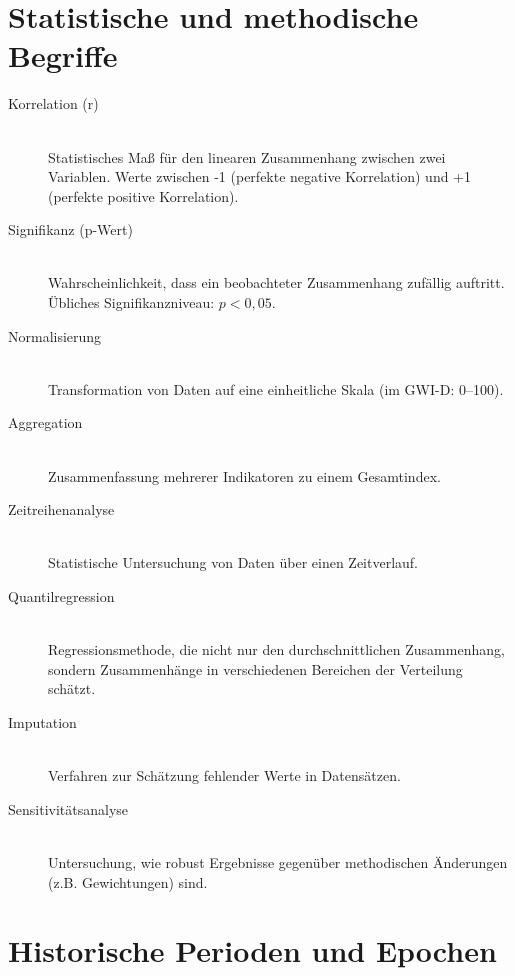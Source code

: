 \section{Statistische und methodische Begriffe}

\begin{description}
    \item[Korrelation (r)] \hfill \\
    Statistisches Maß für den linearen Zusammenhang zwischen zwei Variablen. Werte zwischen -1 (perfekte negative Korrelation) und +1 (perfekte positive Korrelation).
    
    \item[Signifikanz (p-Wert)] \hfill \\
    Wahrscheinlichkeit, dass ein beobachteter Zusammenhang zufällig auftritt. Übliches Signifikanzniveau: \(p < 0,05\).
    
    \item[Normalisierung] \hfill \\
    Transformation von Daten auf eine einheitliche Skala (im GWI-D: 0–100).
    
    \item[Aggregation] \hfill \\
    Zusammenfassung mehrerer Indikatoren zu einem Gesamtindex.
    
    \item[Zeitreihenanalyse] \hfill \\
    Statistische Untersuchung von Daten über einen Zeitverlauf.
    
    \item[Quantilregression] \hfill \\
    Regressionsmethode, die nicht nur den durchschnittlichen Zusammenhang, sondern Zusammenhänge in verschiedenen Bereichen der Verteilung schätzt.
    
    \item[Imputation] \hfill \\
    Verfahren zur Schätzung fehlender Werte in Datensätzen.
    
    \item[Sensitivitätsanalyse] \hfill \\
    Untersuchung, wie robust Ergebnisse gegenüber methodischen Änderungen (z.B. Gewichtungen) sind.
\end{description}

\section{Historische Perioden und Epochen}

